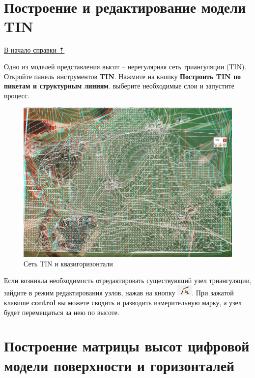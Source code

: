 \documentclass[
  12pt,
]{book}
\begin{document}
\hypertarget{photomod_DEM-TIN}{%
\section{Построение и редактирование модели TIN}\label{photomod_DEM-TIN}}

\protect\hyperlink{photomod_DEM}{В начало справки ⇡}

Одно из моделей представления высот -- нерегулярная сеть триангуляции (TIN). Откройте панель инструментов \textbf{TIN}. Нажмите на кнопку \textbf{Построить TIN по пикетам и структурным линиям}. выберите необходимые слои и запустите процесс.

\begin{figure}
\centering
\includegraphics{images/Ref16/TIN.png}
\caption{Сеть TIN и квазигоризонтали}
\end{figure}

Если возникла необходимость отредактировать существующий узел триангуляции, зайдите в режим редактирования узлов, нажав на кнопку \includegraphics{images/Ref16/Vertex_Edit.png}. При зажатой клавише \textbf{control} вы можете сводить и разводить измерительную марку, а узел будет перемещаться за нею по высоте.

\hypertarget{photomod_DEM-H_matrix}{%
\section{Построение матрицы высот цифровой модели поверхности и горизонталей}\label{photomod_DEM-H_matrix}}
\end{document}
